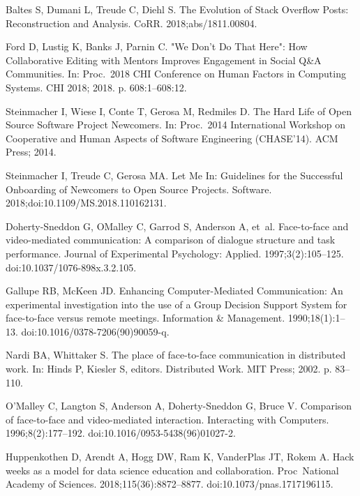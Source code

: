 \documentclass[10pt,letterpaper]{article}
\begin{document}
\begin{thebibliography}{10}
Baltes S, Dumani L, Treude C, Diehl S.
\newblock The Evolution of Stack Overflow Posts: Reconstruction and Analysis.
\newblock CoRR. 2018;abs/1811.00804.

Ford D, Lustig K, Banks J, Parnin C.
\newblock "We Don't Do That Here": How Collaborative Editing with Mentors
  Improves Engagement in Social {Q\&A} Communities.
\newblock In: Proc.\ 2018 CHI Conference on Human Factors in Computing Systems.
  CHI 2018; 2018. p. 608:1--608:12.

Steinmacher I, Wiese I, Conte T, Gerosa M, Redmiles D.
\newblock The Hard Life of Open Source Software Project Newcomers.
\newblock In: Proc.\ 2014 International Workshop on Cooperative and Human
  Aspects of Software Engineering ({CHASE'14}). {ACM} Press; 2014.

Steinmacher I, Treude C, Gerosa MA.
\newblock Let Me In: Guidelines for the Successful Onboarding of Newcomers to
  Open Source Projects.
 Software. 2018;doi:{10.1109/MS.2018.110162131}.

Doherty-Sneddon G, O{\textquotesingle}Malley C, Garrod S, Anderson A, et~al.
\newblock Face-to-face and video-mediated communication: A comparison of
  dialogue structure and task performance.
\newblock Journal of Experimental Psychology: Applied. 1997;3(2):105--125.
\newblock doi:{10.1037/1076-898x.3.2.105}.

Gallupe RB, McKeen JD.
\newblock Enhancing Computer-Mediated Communication: An experimental
  investigation into the use of a Group Decision Support System for
  face-to-face versus remote meetings.
\newblock Information {\&} Management. 1990;18(1):1--13.
\newblock doi:{10.1016/0378-7206(90)90059-q}.

Nardi BA, Whittaker S.
\newblock The place of face-to-face communication in distributed work.
\newblock In: Hinds P, Kiesler S, editors. Distributed Work. {MIT} Press; 2002.
  p. 83--110.

O'Malley C, Langton S, Anderson A, Doherty-Sneddon G, Bruce V.
\newblock Comparison of face-to-face and video-mediated interaction.
\newblock Interacting with Computers. 1996;8(2):177--192.
\newblock doi:{10.1016/0953-5438(96)01027-2}.

Huppenkothen D, Arendt A, Hogg DW, Ram K, VanderPlas JT, Rokem A.
\newblock Hack weeks as a model for data science education and collaboration.
\newblock Proc\ National Academy of Sciences. 2018;115(36):8872--8877.
\newblock doi:{10.1073/pnas.1717196115}.


\end{thebibliography}
\end{document}
